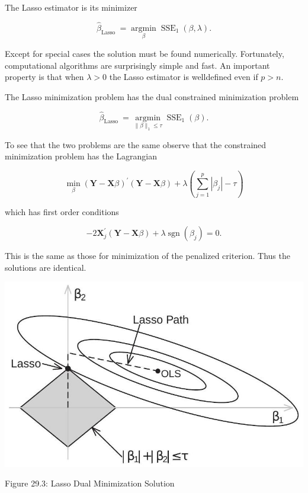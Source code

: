 \documentclass[10pt]{article}
\begin{document}
The Lasso estimator is its minimizer

$$
\widehat{\beta}_{\text {Lasso }}=\underset{\beta}{\operatorname{argmin}} \operatorname{SSE}_{1}(\beta, \lambda) .
$$

Except for special cases the solution must be found numerically. Fortunately, computational algorithms are surprisingly simple and fast. An important property is that when $\lambda>0$ the Lasso estimator is welldefined even if $p>n$.

The Lasso minimization problem has the dual constrained minimization problem

$$
\widehat{\beta}_{\text {Lasso }}=\underset{\|\beta\|_{1} \leq \tau}{\operatorname{argmin}} \operatorname{SSE}_{1}(\beta) .
$$

To see that the two problems are the same observe that the constrained minimization problem has the Lagrangian

$$
\min _{\beta}(\boldsymbol{Y}-\boldsymbol{X} \beta)^{\prime}(\boldsymbol{Y}-\boldsymbol{X} \beta)+\lambda\left(\sum_{j=1}^{p}\left|\beta_{j}\right|-\tau\right)
$$

which has first order conditions

$$
-2 \boldsymbol{X}_{j}^{\prime}(\boldsymbol{Y}-\boldsymbol{X} \beta)+\lambda \operatorname{sgn}\left(\beta_{j}\right)=0 .
$$

This is the same as those for minimization of the penalized criterion. Thus the solutions are identical.

\begin{center}
\includegraphics[max width=\textwidth]{2022_11_27_70699ac9776c9435969dg-10}
\end{center}

Figure 29.3: Lasso Dual Minimization Solution
\end{document}
